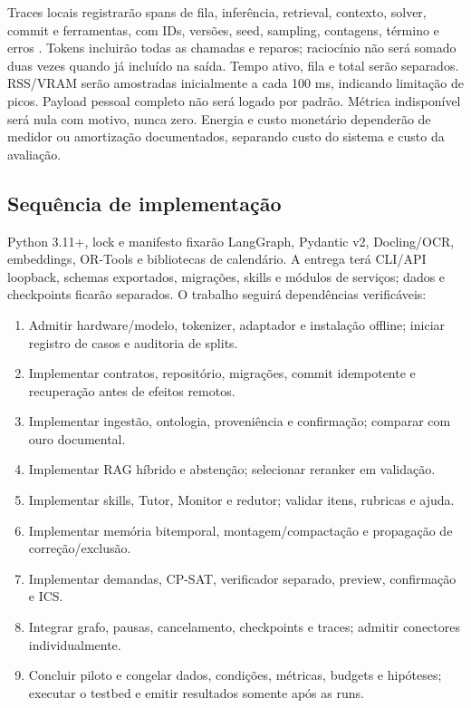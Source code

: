 \documentclass[12pt]{article}
\let\cite\citep
\begin{document}
Traces locais registrarão spans de fila, inferência, retrieval, contexto, solver, commit e ferramentas, com IDs, versões, seed, sampling, contagens, término e erros \cite{oteltrace}. Tokens incluirão todas as chamadas e reparos; raciocínio não será somado duas vezes quando já incluído na saída. Tempo ativo, fila e total serão separados. RSS/VRAM serão amostradas inicialmente a cada 100 ms, indicando limitação de picos. Payload pessoal completo não será logado por padrão. Métrica indisponível será nula com motivo, nunca zero. Energia e custo monetário dependerão de medidor ou amortização documentados, separando custo do sistema e custo da avaliação.

\subsection{Sequência de implementação}

Python 3.11+, lock e manifesto fixarão LangGraph, Pydantic v2, Docling/OCR, embeddings, OR-Tools e bibliotecas de calendário. A entrega terá CLI/API loopback, schemas exportados, migrações, skills e módulos de serviços; dados e checkpoints ficarão separados. O trabalho seguirá dependências verificáveis:
\begin{enumerate}
\item Admitir hardware/modelo, tokenizer, adaptador e instalação offline; iniciar registro de casos e auditoria de splits.
\item Implementar contratos, repositório, migrações, commit idempotente e recuperação antes de efeitos remotos.
\item Implementar ingestão, ontologia, proveniência e confirmação; comparar com ouro documental.
\item Implementar RAG híbrido e abstenção; selecionar reranker em validação.
\item Implementar skills, Tutor, Monitor e redutor; validar itens, rubricas e ajuda.
\item Implementar memória bitemporal, montagem/compactação e propagação de correção/exclusão.
\item Implementar demandas, CP-SAT, verificador separado, preview, confirmação e ICS.
\item Integrar grafo, pausas, cancelamento, checkpoints e traces; admitir conectores individualmente.
\item Concluir piloto e congelar dados, condições, métricas, budgets e hipóteses; executar o testbed e emitir resultados somente após as runs.
\end{enumerate}
\end{document}
